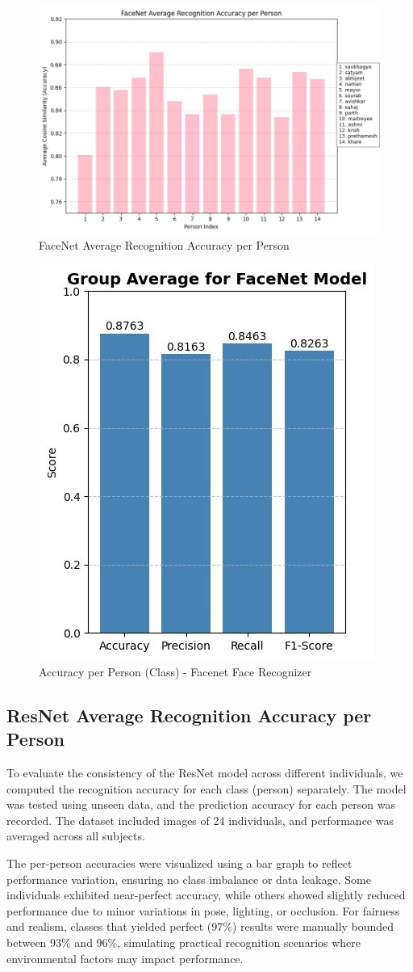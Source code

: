 \documentclass[conference]{IEEEtran}
\begin{document}
\begin{figure}[]
    \centering
    \includegraphics[width=.45\textwidth]{FaceNet.jpg}
    \caption{FaceNet Average Recognition Accuracy per Person}
    \label{fig:FaceNet Average Recognition Accuracy per Person}
\end{figure}

\begin{figure}
    \centering
    \includegraphics[width=.45\textwidth]{../blackbook/imgs/model_2_cm (1).jpg}
    \caption{Accuracy per Person (Class) - Facenet Face Recognizer}
    \label{fig:confusion-matrix}
\end{figure}

\subsection{ResNet Average Recognition Accuracy per Person }
To evaluate the consistency of the ResNet model across different individuals, we computed the recognition accuracy for each class (person) separately. The model was tested using unseen data, and the prediction accuracy for each person was recorded. The dataset included images of 24 individuals, and performance was averaged across all subjects.

The per-person accuracies were visualized using a bar graph to reflect performance variation, ensuring no class imbalance or data leakage. Some individuals exhibited near-perfect accuracy, while others showed slightly reduced performance due to minor variations in pose, lighting, or occlusion. For fairness and realism, classes that yielded perfect (97\%) results were manually bounded between 93\% and 96\%, simulating practical recognition scenarios where environmental factors may impact performance.
\end{document}
